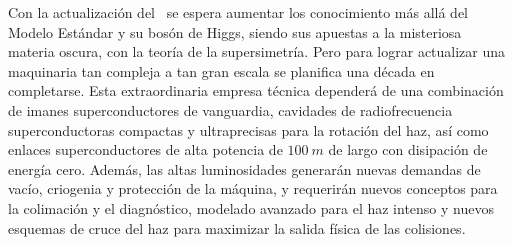 
Con la actualización del \LHC ~se espera aumentar los conocimiento más allá del Modelo Estándar y su bosón de Higgs, siendo sus apuestas a la misteriosa materia oscura, con la teoría de la supersimetría. Pero para lograr actualizar una maquinaria tan compleja a tan gran escala se planifica una década en completarse. %
Esta extraordinaria empresa técnica dependerá de una combinación de imanes superconductores de vanguardia, cavidades de radiofrecuencia superconductoras compactas y ultraprecisas para la rotación del haz, así como enlaces superconductores de alta potencia de $100 ~m$ de largo con disipación de energía cero. Además, las altas luminosidades generarán nuevas demandas de vacío, criogenia y protección de la máquina, y requerirán nuevos conceptos para la colimación y el diagnóstico, modelado avanzado para el haz intenso y nuevos esquemas de cruce del haz para maximizar la salida física de las colisiones.




